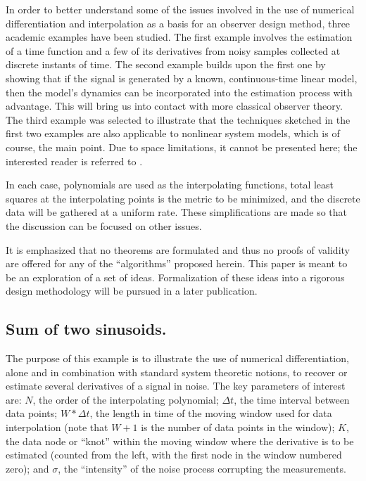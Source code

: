 In order to better understand some of the issues involved in the use of  
numerical differentiation and interpolation as a basis for an
observer design method, three academic
examples have been studied.  The first example
involves the estimation
of a time function and a few of its derivatives from noisy samples collected at
discrete instants of time.  The second example builds upon the first one
by showing that if the signal is generated by a known,
continuous-time linear model,
then the model's dynamics can be incorporated into the estimation
process with advantage.  This will bring us into contact with more classical observer
theory.  The third example was selected to illustrate that the techniques sketched in the
first two examples are
also applicable to nonlinear system models, which is of course, the main
point.  Due to space limitations, it cannot be presented here; the interested
reader is referred to \cite{UMTechReport93}. 


In each case, polynomials are used as the interpolating
functions, total least squares at the interpolating points is the 
metric to be minimized, and the discrete data will be gathered at a uniform rate.
These simplifications are made so that the discussion can be focused on other issues.

It is emphasized that no theorems are formulated and thus no proofs of validity
are
offered for any of the ``algorithms'' proposed herein.  This paper is meant to be an
exploration of a set of ideas.  Formalization of these ideas into a rigorous design
methodology will be pursued in a later publication.  

\subsection{Sum of two sinusoids.}

The purpose of this example is to illustrate the use of numerical
differentiation, alone and 
in combination with standard system theoretic notions,
to recover or estimate several derivatives of a signal in noise.  The key
parameters of interest are: $N$, the order of the interpolating polynomial;
$\Delta t$, the time interval between data points;
$W * \Delta t$, the length in time of the moving window used for data interpolation
(note that $W + 1$ is the number of data points in the window);
$K$, the data node or ``knot'' within the moving window 
where the derivative is to be estimated (counted from the left, with
the first node in the window numbered zero); and $\sigma$, the ``intensity'' 
of the noise process corrupting the measurements.

